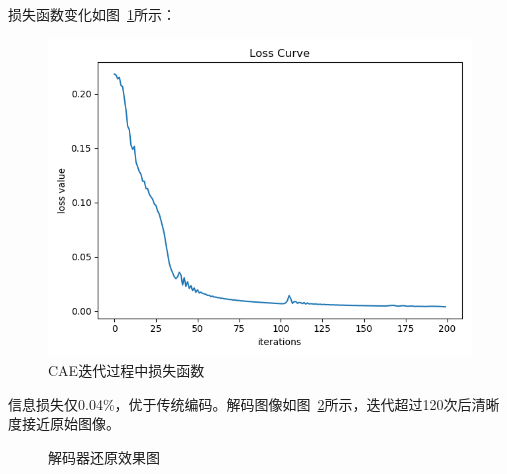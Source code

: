 \documentclass{whutmod}
\begin{document}
            损失函数变化如图~\ref{loss}所示：

            \begin{figure}[H]
                \centering
                \includegraphics[width=.7\textwidth]{figures/loss.png}
                \caption{CAE迭代过程中损失函数}\label{loss}
            \end{figure}

            信息损失仅0.04\%，优于传统编码。解码图像如图~\ref{zhiwen}所示，迭代超过120次后清晰度接近原始图像。

            \begin{figure}[H]
                \centering
                \caption{解码器还原效果图}\label{zhiwen}
            \end{figure}
\end{document}
